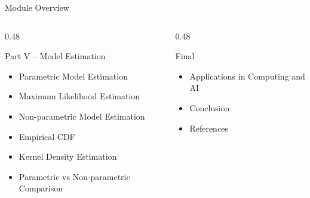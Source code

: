 \documentclass[aspectratio=169,12pt]{beamer}
\begin{document}

\begin{frame}{Module Overview}

\begin{columns}[T,totalwidth=\textwidth]

\begin{column}{0.48\textwidth}

\begin{block}{Part V -- Model Estimation}

\begin{itemize}
    \item Parametric Model Estimation
    \item Maximum Likelihood Estimation
    \item Non-parametric Model Estimation
    \item Empirical CDF
    \item Kernel Density Estimation
    \item Parametric vs Non-parametric Comparison
\end{itemize}

\end{block}

\end{column}

\begin{column}{0.48\textwidth}

\begin{block}{Final}

\begin{itemize}
    \item Applications in Computing and AI
    \item Conclusion
    \item References
\end{itemize}

\end{block}

\end{column}

\end{columns}

\end{frame}

\end{document}
